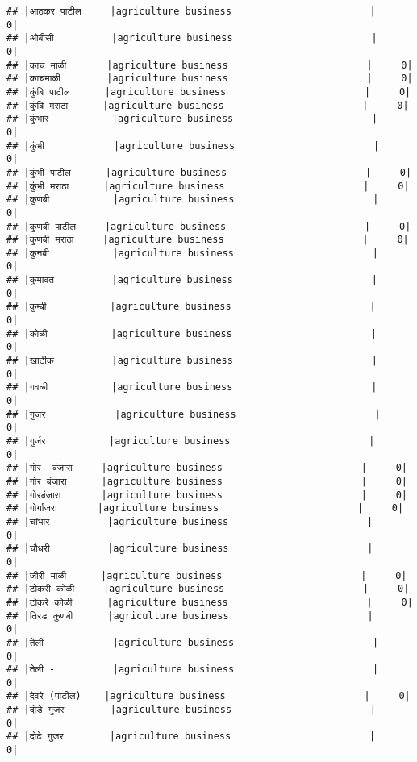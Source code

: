 \documentclass[
]{article}
\begin{document}
\begin{verbatim}
## |आठकर पाटील     |agriculture business                        |     0|
## |ओबीसी          |agriculture business                        |     0|
## |काच माळी       |agriculture business                        |     0|
## |काचमाळी        |agriculture business                        |     0|
## |कुंबि पाटील      |agriculture business                        |     0|
## |कुंबि मराठा      |agriculture business                        |     0|
## |कुंभार           |agriculture business                        |     0|
## |कुंभी            |agriculture business                        |     0|
## |कुंभी पाटील      |agriculture business                        |     0|
## |कुंभी मराठा      |agriculture business                        |     0|
## |कुणबी           |agriculture business                        |     0|
## |कुणबी पाटील     |agriculture business                        |     0|
## |कुणबी मराठा     |agriculture business                        |     0|
## |कुनबी           |agriculture business                        |     0|
## |कुमावत          |agriculture business                        |     0|
## |कुम्बी           |agriculture business                        |     0|
## |कोळी           |agriculture business                        |     0|
## |खाटीक          |agriculture business                        |     0|
## |गवळी           |agriculture business                        |     0|
## |गुजर            |agriculture business                        |     0|
## |गुर्जर           |agriculture business                        |     0|
## |गोर  बंजारा     |agriculture business                        |     0|
## |गोर बंजारा      |agriculture business                        |     0|
## |गोरबंजारा       |agriculture business                        |     0|
## |गोर्गांजरा       |agriculture business                        |     0|
## |चांभार          |agriculture business                        |     0|
## |चौधरी          |agriculture business                        |     0|
## |जीरी माळी      |agriculture business                        |     0|
## |टोकरी कोळी     |agriculture business                        |     0|
## |टोकरे कोळी      |agriculture business                        |     0|
## |तिरड कुणबी      |agriculture business                        |     0|
## |तेली            |agriculture business                        |     0|
## |तेली -          |agriculture business                        |     0|
## |देवरे (पाटील)    |agriculture business                        |     0|
## |दोडे गुजर        |agriculture business                        |     0|
## |दोढे गुजर        |agriculture business                        |     0|

\end{verbatim}
\end{document}
